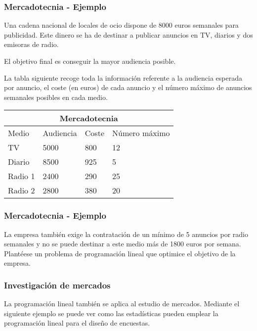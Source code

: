 \documentclass{beamer}
\begin{document}
\begin{frame}
\frametitle{Mercadotecnia - Ejemplo}
Una cadena nacional de locales de ocio dispone de 8000 euros semanales para publicidad. Este dinero se ha de destinar a publicar anuncios en TV, diarios y dos emisoras de radio.

El objetivo final es conseguir la mayor audiencia posible.

La tabla siguiente recoge toda la informaci\'on referente a la audiencia esperada por anuncio, el coste (en euros) de cada anuncio y el n\'umero m\'aximo de anuncios semanales posibles en cada medio.

\begin{tabular}{ |p{2cm}||p{2cm}|p{2cm}|p{2.8cm}|  }
 \hline
 \multicolumn{4}{|c|}{Mercadotecnia} \\
 \hline
 Medio& Audiencia &Coste & N\'umero m\'aximo\\
 \hline
 TV   & 5000   &800&12\\
 Diario & 8500 &925&5\\
 Radio 1   & 2400  &290&25\\
 Radio 2  & 2800   &380&20\\
    \hline
\end{tabular}
\end{frame}




\begin{frame}
\frametitle{Mercadotecnia - Ejemplo}
La empresa tambi\'en exige la contrataci\'on de un m\'inimo de 5 anuncios por radio semanales y no se puede destinar a este medio m\'as de 1800 euros por semana.
Plant\'eese un problema de programaci\'on lineal que optimice el objetivo de la empresa.
\end{frame}




\begin{frame}
\frametitle{Investigaci\'on de mercados}
 La programaci\'on lineal tambi\'en se aplica al estudio de mercados. Mediante el siguiente ejemplo se puede ver como las estad\'isticas pueden emplear la programaci\'on lineal para el dise\~no de encuestas.
 \end{frame}
\end{document}
